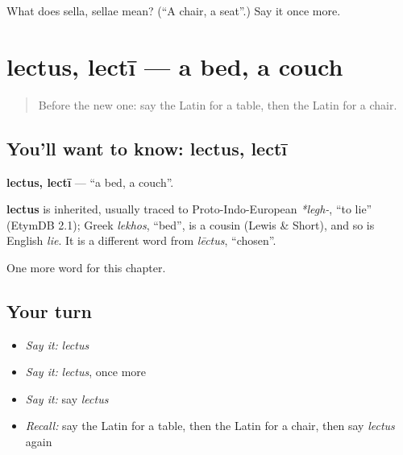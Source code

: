 \begin{tcolorbox}[breakable,colback=teal!4,colframe=teal!35!black,title={Before you move on}]
What does sella, sellae mean? (\textquotedblleft{}A chair, a seat\textquotedblright{}.) Say it once more.
\end{tcolorbox}
\section[lectus, lectī]{lectus, lectī — a bed, a couch}

\label{lesson:LA-C82-lectus}



\begin{quote}
Before the new one: say the Latin for a table, then the Latin for a chair.
\end{quote}

\subsection*{You'll want to know: lectus, lectī}
\textbf{lectus, lectī} — \textquotedblleft{}a bed, a couch\textquotedblright{}.

\begin{cousinweb}
\textbf{lectus} is inherited, usually traced to Proto-Indo-European \emph{*legh-}, \textquotedblleft{}to lie\textquotedblright{} (EtymDB 2.1); Greek \emph{lekhos}, \textquotedblleft{}bed\textquotedblright{}, is a cousin (Lewis \& Short), and so is English \emph{lie}. It is a different word from \emph{lēctus}, \textquotedblleft{}chosen\textquotedblright{}.
\end{cousinweb}

\begin{grammarlens}[title={What you've built}]
One more word for this chapter.
\end{grammarlens}

\subsection*{Your turn}
\begin{itemize}
\raggedright
  \item \emph{Say it:} \emph{lectus}
  \item \emph{Say it:} \emph{lectus}, once more
  \item \emph{Say it:} say \emph{lectus}
  \item \emph{Recall:} say the Latin for a table, then the Latin for a chair, then say \emph{lectus} again
\end{itemize}

